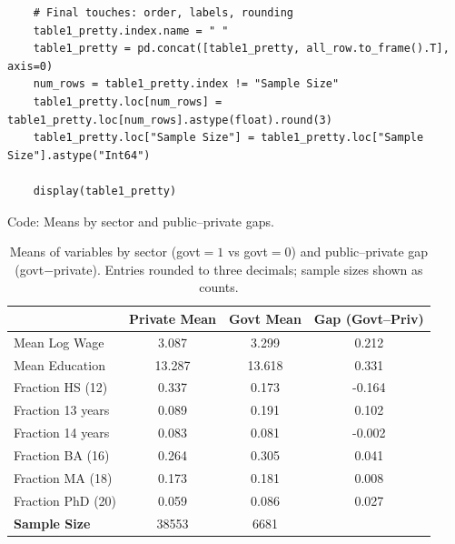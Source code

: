 \documentclass[12pt]{article}
\numberwithin{equation}{section}
\begin{document}
\begin{enumerate}[leftmargin=2em]
\begin{listing}
\begin{verbatim}
    # Final touches: order, labels, rounding
    table1_pretty.index.name = " "
    table1_pretty = pd.concat([table1_pretty, all_row.to_frame().T], axis=0)
    num_rows = table1_pretty.index != "Sample Size"
    table1_pretty.loc[num_rows] = table1_pretty.loc[num_rows].astype(float).round(3)
    table1_pretty.loc["Sample Size"] = table1_pretty.loc["Sample Size"].astype("Int64")
    
    display(table1_pretty)
    \end{verbatim}
    \caption{Code: Means by sector and public–private gaps.}
    \end{listing}
    
        \begin{table}[H]
          \centering
          
          
          \caption{Means of variables by sector (govt$=1$ vs govt$=0$) and public--private gap (govt$-$private). 
          Entries rounded to three decimals; sample sizes shown as counts.}

          \vspace{0.3cm} %

          \label{tab:means-by-sector}
          \begin{tabular}{l S S S}
                \toprule
                & {\textbf{Private Mean}} & {\textbf{Govt Mean}} & {\textbf{Gap (Govt--Priv)}}\\
                \midrule
                Mean Log Wage     & 3.087 & 3.299 & 0.212 \\
                Mean Education    & 13.287 & 13.618 & 0.331 \\
                Fraction HS (12)  & 0.337 & 0.173 & -0.164 \\
                Fraction 13 years & 0.089 & 0.191 & 0.102 \\
                Fraction 14 years & 0.083 & 0.081 & -0.002 \\
                Fraction BA (16)  & 0.264 & 0.305 & 0.041 \\
                Fraction MA (18)  & 0.173 & 0.181 & 0.008 \\
                Fraction PhD (20) & 0.059 & 0.086 & 0.027 \\
                \midrule
                \textbf{Sample Size} & {\num{38553}} & {\num{6681}} & {} \\
                \bottomrule
              \end{tabular}
            \end{table}


\end{enumerate}
\end{document}
